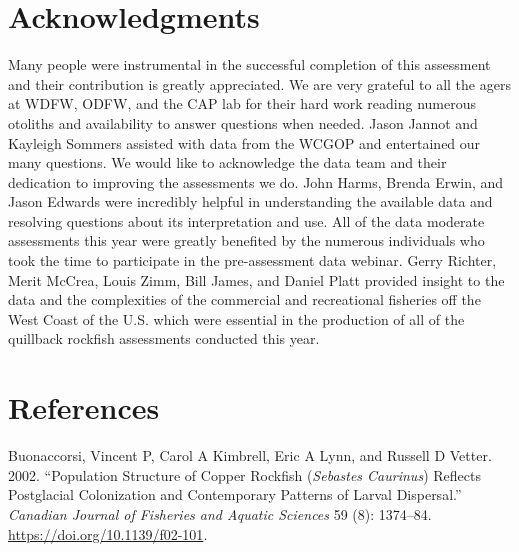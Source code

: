 \documentclass[11pt,
  english,
  a4paper,
]{article}
\begin{document}

\hypertarget{acknowledgments}{%
\section{Acknowledgments}\label{acknowledgments}}

\leavevmode\tagmcend\tagstructend


Many people were instrumental in the successful completion of this assessment and their contribution is greatly appreciated. We are very grateful to all the agers at WDFW, ODFW, and the CAP lab for their hard work reading numerous otoliths and availability to answer questions when needed. Jason Jannot and Kayleigh Sommers assisted with data from the WCGOP and entertained our many questions. We would like to acknowledge the data team and their dedication to improving the assessments we do. John Harms, Brenda Erwin, and Jason Edwards were incredibly helpful in understanding the available data and resolving questions about its interpretation and use. All of the data moderate assessments this year were greatly benefited by the numerous individuals who took the time to participate in the pre-assessment data webinar. Gerry Richter, Merit McCrea, Louis Zimm, Bill James, and Daniel Platt provided insight to the data and the complexities of the commercial and recreational fisheries off the West Coast of the U.S. which were essential in the production of all of the quillback rockfish assessments conducted this year.

\leavevmode\tagmcend\tagstructend\par

\clearpage


\hypertarget{references}{%
\section{References}\label{references}}

\leavevmode\tagmcend\tagstructend


\hypertarget{refs}{}
\leavevmode\hypertarget{ref-buonaccorsi_population_2002}{}%
Buonaccorsi, Vincent P, Carol A Kimbrell, Eric A Lynn, and Russell D Vetter. 2002. ``Population Structure of Copper Rockfish (\emph{Sebastes Caurinus}) Reflects Postglacial Colonization and Contemporary Patterns of Larval Dispersal.'' \emph{Canadian Journal of Fisheries and Aquatic Sciences} 59 (8): 1374--84. \url{https://doi.org/10.1139/f02-101}.
\end{document}
